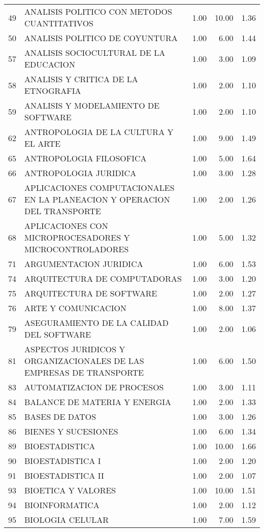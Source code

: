 \begin{table}[ht]
\begin{tabular}{rlrrr}
  49 & ANALISIS POLITICO CON METODOS CUANTITATIVOS & 1.00 & 10.00 & 1.36 \\ 
  50 & ANALISIS POLITICO DE COYUNTURA & 1.00 & 6.00 & 1.44 \\ 
  57 & ANALISIS SOCIOCULTURAL DE LA EDUCACION & 1.00 & 3.00 & 1.09 \\ 
  58 & ANALISIS Y CRITICA DE LA ETNOGRAFIA & 1.00 & 2.00 & 1.10 \\ 
  59 & ANALISIS Y MODELAMIENTO DE SOFTWARE & 1.00 & 2.00 & 1.10 \\ 
  62 & ANTROPOLOGIA DE LA CULTURA Y EL ARTE & 1.00 & 9.00 & 1.49 \\ 
  65 & ANTROPOLOGIA FILOSOFICA & 1.00 & 5.00 & 1.64 \\ 
  66 & ANTROPOLOGIA JURIDICA & 1.00 & 3.00 & 1.28 \\ 
  67 & APLICACIONES COMPUTACIONALES EN LA PLANEACION Y OPERACION DEL TRANSPORTE & 1.00 & 2.00 & 1.26 \\ 
  68 & APLICACIONES CON MICROPROCESADORES Y MICROCONTROLADORES & 1.00 & 5.00 & 1.32 \\ 
  71 & ARGUMENTACION JURIDICA & 1.00 & 6.00 & 1.53 \\ 
  74 & ARQUITECTURA DE COMPUTADORAS & 1.00 & 3.00 & 1.20 \\ 
  75 & ARQUITECTURA DE SOFTWARE & 1.00 & 2.00 & 1.27 \\ 
  76 & ARTE Y COMUNICACION & 1.00 & 8.00 & 1.37 \\ 
  79 & ASEGURAMIENTO DE LA CALIDAD DEL SOFTWARE & 1.00 & 2.00 & 1.06 \\ 
  81 & ASPECTOS JURIDICOS Y ORGANIZACIONALES DE LAS EMPRESAS DE TRANSPORTE & 1.00 & 6.00 & 1.50 \\ 
  83 & AUTOMATIZACION DE PROCESOS & 1.00 & 3.00 & 1.11 \\ 
  84 & BALANCE DE MATERIA Y ENERGIA & 1.00 & 2.00 & 1.33 \\ 
  85 & BASES DE DATOS & 1.00 & 3.00 & 1.26 \\ 
  86 & BIENES Y SUCESIONES & 1.00 & 6.00 & 1.34 \\ 
  89 & BIOESTADISTICA & 1.00 & 10.00 & 1.66 \\ 
  90 & BIOESTADISTICA I & 1.00 & 2.00 & 1.20 \\ 
  91 & BIOESTADISTICA II & 1.00 & 2.00 & 1.07 \\ 
  93 & BIOETICA Y VALORES & 1.00 & 10.00 & 1.51 \\ 
  94 & BIOINFORMATICA & 1.00 & 2.00 & 1.12 \\ 
  95 & BIOLOGIA CELULAR & 1.00 & 7.00 & 1.59 \\ 

\end{tabular}
\end{table}
